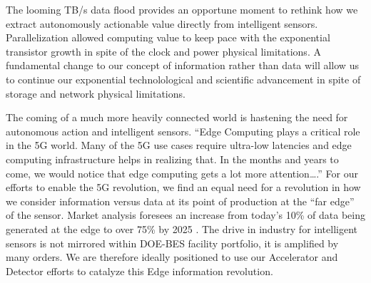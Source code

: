\documentclass{article}
\begin{document}
The looming TB/s data flood provides an opportune moment to rethink how we extract autonomously actionable value directly from intelligent sensors.
Parallelization allowed computing value to keep pace with the exponential transistor growth in spite of the clock and power physical limitations.
A fundamental change to our concept of information rather than data will allow us to continue our exponential technolological and scientific advancement in spite of storage and network physical limitations.

The coming of a much more heavily connected world is hastening the need for autonomous action and intelligent sensors. 
``Edge Computing plays a critical role in the 5G world. Many of the 5G use cases require ultra-low latencies and edge computing infrastructure helps in realizing that. In the months and years to come, we would notice that edge computing gets a lot more attention\ldots.'' \cite{thetech}
For our efforts to enable the 5G revolution, we find an equal need for a revolution in how we consider information versus data at its point of production at the ``far edge'' of the sensor.
Market analysis foresees an increase from today's 10\% of data being generated at the edge to over 75\% by 2025 \cite{NetworkWorld2019,Gartner2019}.
The drive in industry for intelligent sensors is not mirrored within DOE-BES facility portfolio, it is amplified by many orders.
We are therefore ideally positioned to use our Accelerator and Detector efforts to catalyze this Edge information revolution.

\end{document}
